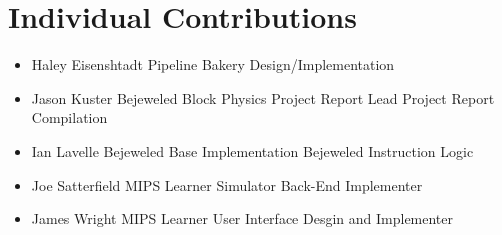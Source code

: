 \documentclass[12pt]{article}
\begin{document}
	\section{Individual Contributions}
	\begin{itemize}
		\item Haley Eisenshtadt
		\subitem Pipeline Bakery Design/Implementation
		\item Jason Kuster
		\subitem Bejeweled Block Physics
		\subitem Project Report Lead
		\subitem Project Report Compilation
		\item Ian Lavelle
		\subitem Bejeweled Base Implementation
		\subitem Bejeweled Instruction Logic
		\item Joe Satterfield
		\subitem MIPS Learner Simulator Back-End Implementer
		\item James Wright
		\subitem MIPS Learner User Interface Desgin and Implementer
	\end{itemize}
\end{document}
